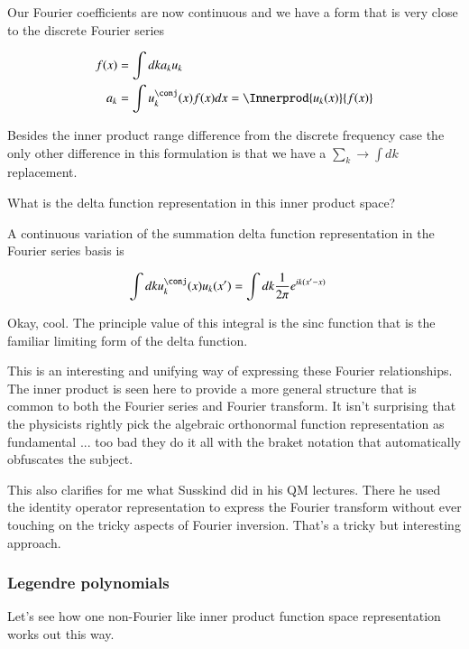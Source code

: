 Our Fourier coefficients are now continuous and we have a form that
is very close to the discrete Fourier series

\begin{align*}
f(x) 
&= \int dk a_k u_k \\
a_k &= \int u_k^\conj(x) f(x) dx = \Innerprod{u_k(x)}{f(x)} \\
\end{align*}

Besides the inner product range difference from the discrete frequency case
the only other difference in this formulation is that we have a 
$\sum_k \rightarrow \int dk$ replacement.

What is the delta function representation in this inner product space?

A continuous variation of the summation delta function representation
in the Fourier series basis is

\begin{align*}
\int dk u_k^\conj(x) u_k(x')
&=
\int dk \inv{2\pi} e^{ i k (x' - x)}
\end{align*}

Okay, cool.  The principle value of this integral is the sinc function
that is the familiar limiting form of the delta function.

This is an interesting and unifying way of expressing these Fourier 
relationships.  The inner product is seen here to provide a more general
structure that is common to both the Fourier series and Fourier transform.
It isn't surprising that the physicists rightly pick the algebraic
orthonormal function representation as fundamental ... too bad they do it
all with the braket notation that automatically obfuscates the subject.

This also clarifies for me what Susskind did in his QM lectures.  There
he used the identity operator representation to express the Fourier transform
without ever touching on the tricky aspects of Fourier inversion.  That's a
tricky but interesting approach.

\subsubsection{Legendre polynomials }

Let's see how one non-Fourier like inner product function space 
representation works out this way.

